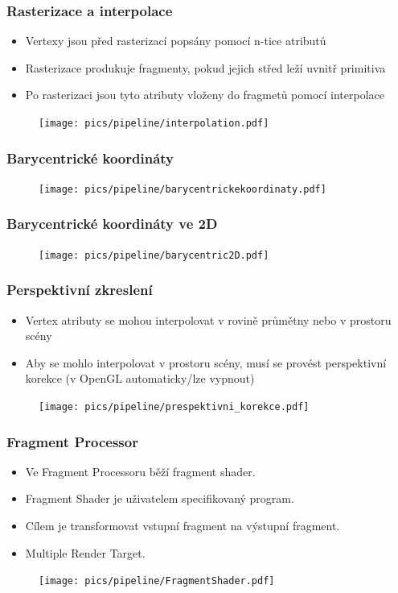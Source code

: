 \begin{frame}
\frametitle{Rasterizace a interpolace}
	\begin{itemize}
		\item Vertexy jsou před rasterizací popsány pomocí n-tice atributů
    \item Rasterizace produkuje fragmenty, pokud jejich střed leží uvnitř primitiva
    \item Po rasterizaci jsou tyto atributy vloženy do fragmetů pomocí interpolace
	\end{itemize}
	\begin{figure}[h]
		\texttt{[image: pics/pipeline/interpolation.pdf]}
	\end{figure}
\end{frame}

\begin{frame}
\frametitle{Barycentrické koordináty}
	\begin{figure}[h]
		\texttt{[image: pics/pipeline/barycentrickekoordinaty.pdf]}
	\end{figure}
\end{frame}

\begin{frame}
\frametitle{Barycentrické koordináty ve 2D}
	\begin{figure}[h]
		\texttt{[image: pics/pipeline/barycentric2D.pdf]}
	\end{figure}
\end{frame}

\begin{frame}
\frametitle{Perspektivní zkreslení}
	\begin{itemize}
		\item Vertex atributy se mohou interpolovat v rovině průmětny nebo v prostoru scény
    \item Aby se mohlo interpolovat v prostoru scény, musí se provést perspektivní korekce
      (v OpenGL automaticky/lze vypnout)
	\end{itemize}
	\begin{figure}[h]
		\texttt{[image: pics/pipeline/prespektivni\_korekce.pdf]}
	\end{figure}
\end{frame}

\begin{frame}
\frametitle{Fragment Processor}
	\begin{itemize}
		\item Ve Fragment Processoru běží fragment shader.
    \item Fragment Shader je uživatelem specifikovaný program.
    \item Cílem je transformovat vstupní fragment na výstupní fragment.
    \item Multiple Render Target.
	\end{itemize}
	\begin{figure}[h]
		\texttt{[image: pics/pipeline/FragmentShader.pdf]}
	\end{figure}
\end{frame}

